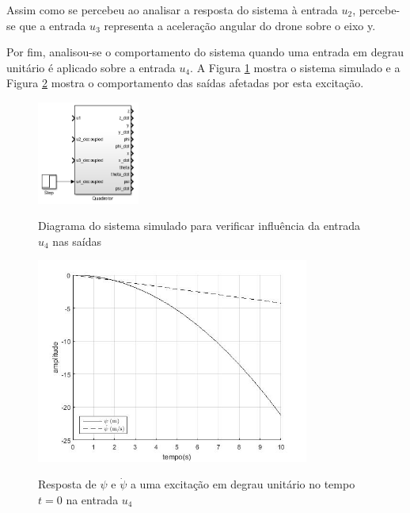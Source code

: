 Assim como se percebeu ao analisar a resposta do sistema à entrada $u_2$, percebe-se que a entrada $u_3$ representa a aceleração angular do drone sobre o eixo y.

Por fim, analisou-se o comportamento do sistema quando uma entrada em degrau unitário é aplicado sobre a entrada $u_4$. A Figura \ref{fig:resultados_bloco_quadrotor_entrada_u4} mostra o sistema simulado e a Figura \ref{fig:resultados_malha_aberta_u4_psi} mostra o comportamento das saídas afetadas por esta excitação.

\begin{figure}[!htb]
    \centering
    \caption{Diagrama do sistema simulado para verificar influência da entrada $u_4$ nas saídas}
    \includegraphics[width=0.3\textwidth]{./04-figuras/resultados/malha_aberta/resultados_bloco_quadrotor_entrada_u4}
    \label{fig:resultados_bloco_quadrotor_entrada_u4}
\end{figure}

\begin{figure}[!htb]
    \centering
    \caption{Resposta de $\psi$ e $\dot{\psi}$ a uma excitação em degrau unitário no tempo $t=0$ na entrada $u_4$}
    \includegraphics[width=0.8\textwidth]{./04-figuras/resultados/malha_aberta/u4_psi}
    \label{fig:resultados_malha_aberta_u4_psi}
\end{figure}

